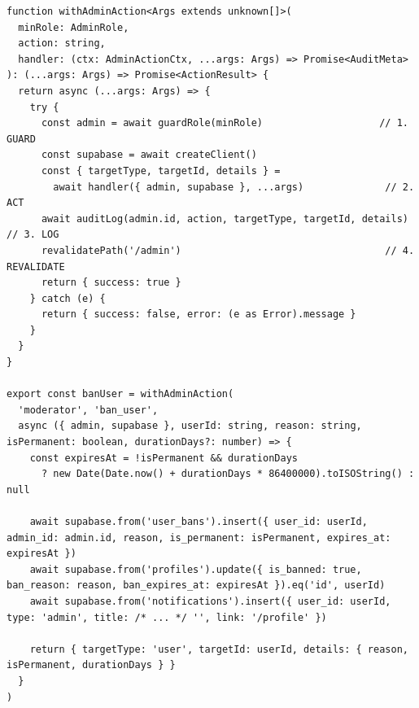 \begin{lstlisting}[caption={src/lib/admin-actions.ts — the shared wrapper, illustrated with banUser}]
function withAdminAction<Args extends unknown[]>(
  minRole: AdminRole,
  action: string,
  handler: (ctx: AdminActionCtx, ...args: Args) => Promise<AuditMeta>
): (...args: Args) => Promise<ActionResult> {
  return async (...args: Args) => {
    try {
      const admin = await guardRole(minRole)                    // 1. GUARD
      const supabase = await createClient()
      const { targetType, targetId, details } =
        await handler({ admin, supabase }, ...args)              // 2. ACT
      await auditLog(admin.id, action, targetType, targetId, details)  // 3. LOG
      revalidatePath('/admin')                                   // 4. REVALIDATE
      return { success: true }
    } catch (e) {
      return { success: false, error: (e as Error).message }
    }
  }
}

export const banUser = withAdminAction(
  'moderator', 'ban_user',
  async ({ admin, supabase }, userId: string, reason: string, isPermanent: boolean, durationDays?: number) => {
    const expiresAt = !isPermanent && durationDays
      ? new Date(Date.now() + durationDays * 86400000).toISOString() : null

    await supabase.from('user_bans').insert({ user_id: userId, admin_id: admin.id, reason, is_permanent: isPermanent, expires_at: expiresAt })
    await supabase.from('profiles').update({ is_banned: true, ban_reason: reason, ban_expires_at: expiresAt }).eq('id', userId)
    await supabase.from('notifications').insert({ user_id: userId, type: 'admin', title: /* ... */ '', link: '/profile' })

    return { targetType: 'user', targetId: userId, details: { reason, isPermanent, durationDays } }
  }
)
\end{lstlisting}

